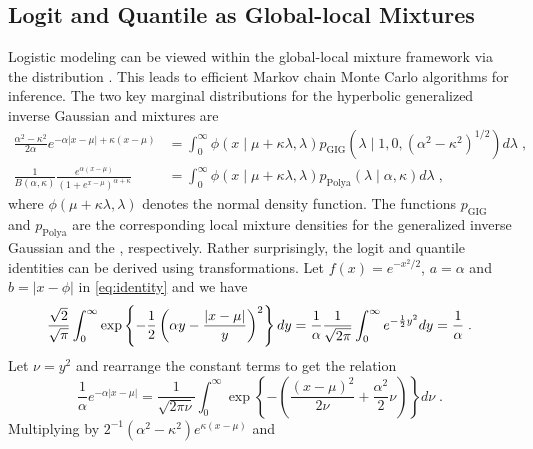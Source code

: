 \documentclass[lineno]{biometrika}
\begin{document}
\subsection{Logit and Quantile as Global-local Mixtures}
Logistic modeling can be viewed within the global-local mixture framework via
the \PG{} distribution \citep{polson_bayesian_2013}. This leads to efficient
Markov chain Monte Carlo algorithms for inference.  The two key marginal
distributions for the hyperbolic generalized inverse Gaussian 
\citep{barndorff1982normal} and \PG{} mixtures are
\begin{align}
  \frac{\alpha^2 - \kappa^2}{2\alpha} e^{-\alpha|x-\mu| + \kappa (x-\mu)} 
  &= \int_0^{\infty} \phi(x \mid \mu + \kappa \lambda, \lambda) 
  p_{\mathrm{GIG}}\left(\lambda \mid 1,0, (\alpha^2 - \kappa^2)^{1/2}\right) d\lambda
  \;, 
  \label{eq:GIG}
  \\
  \frac{1}{B(\alpha,\kappa)} \frac{e^{\alpha (x-\mu)}}{(1+e^{x-\mu})^{\alpha + \kappa}} 
  &= \int_0^{\infty} \phi(x \mid \mu + \kappa \lambda, \lambda) 
  p_{\mathrm{Polya}}(\lambda \mid \alpha,\kappa)  d\lambda
  \;, 
  \label{eq:polya}
\end{align}
where $\phi(\mu + \kappa \lambda, \lambda)$ denotes the normal density
function.  The functions $p_{\mathrm{GIG}}$ and $p_{\mathrm{Polya}}$ are
the corresponding local mixture densities for the generalized inverse Gaussian and
the \PG{}, respectively.  Rather surprisingly, the logit and quantile
identities can be derived using \CS{} transformations.  
Let $f(x) = e^{-x^2/2}$, $a = \alpha$ and $b = |x-\phi|$ in \eqref{eq:identity}
and we have 
$$
\frac{\sqrt{2}}{\sqrt{\pi}} \int_{0}^{\infty} 
\exp\left\{-\frac{1}{2} \left(\alpha y - \frac{|x-\mu|}{y} \right)^2 \right\} dy 
= \frac{1}{\alpha} \frac{1}{\sqrt{2\pi}} \int_0^{\infty} e^{-\frac{1}{2} y^2} dy 
= \frac{1}{\alpha}
\;.
$$
Let $\nu = y^2$ and rearrange the constant terms to get the relation
$$
\frac{1}{\alpha} e^{-\alpha|x-\mu|} = 
\frac{1}{\sqrt{2 \pi \nu}} \int_{0}^{\infty} 
\exp\left\{-\left( \frac{(x-\mu)^2}{2\nu} + \frac{\alpha^2}{2} \nu \right)\right\} 
d\nu
\;.
$$
Multiplying by $2^{-1}(\alpha^2-\kappa^2) e^{\kappa(x-\mu)}$ and
\end{document}
